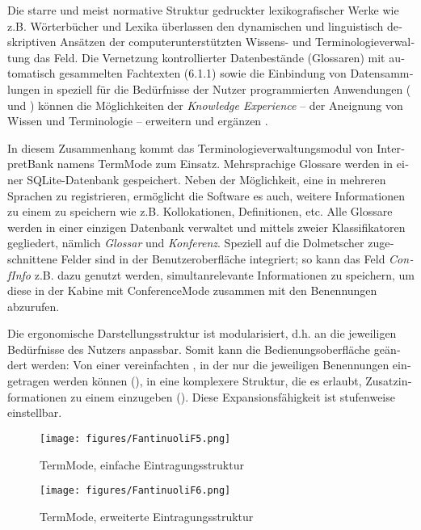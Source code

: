 \documentclass[output=paper]{LSP/langsci}
\begin{document}
\begin{otherlanguage}{ngerman}
Die starre und meist normative Struktur gedruckter lexikografischer Werke wie z.B. Wörterbücher und Lexika überlassen den dynamischen und linguistisch deskriptiven Ansätzen der computerunterstützten Wissens- und Terminologieverwaltung das Feld. Die Vernetzung kontrollierter Datenbestände (Glossaren) mit automatisch gesammelten Fachtexten (6.1.1) sowie die Einbindung von Datensammlungen in speziell für die Bedürfnisse der Nutzer programmierten Anwendungen ( und ) können die Möglichkeiten der \textit{Knowledge Experience} -- der Aneignung von Wissen und Terminologie -- erweitern und ergänzen \citep{Fantinuoli2009}. 

\largerpage
In diesem Zusammenhang kommt das Terminologieverwaltungsmodul von InterpretBank namens TermMode zum Einsatz. Mehrsprachige Glossare werden in einer SQLite-Datenbank gespeichert. Neben der Möglichkeit, eine  in mehreren Sprachen zu registrieren, ermöglicht die Software es auch, weitere Informationen zu einem  zu speichern wie z.B. Kollokationen, Definitionen, etc. Alle Glossare werden in einer einzigen Datenbank verwaltet und mittels zweier Klassifikatoren gegliedert, nämlich \textit{Glossar} und \textit{Konferenz}. Speziell auf die Dolmetscher zugeschnittene Felder sind in der Benutzeroberfläche integriert; so kann das Feld \textit{ConfInfo} z.B. dazu genutzt werden, simultanrelevante Informationen zu speichern, um diese in der Kabine mit ConferenceMode zusammen mit den Benennungen abzurufen.

Die ergonomische Darstellungsstruktur ist modularisiert, d.h. an die jeweiligen Bedürfnisse des Nutzers anpassbar. Somit kann die Bedienungsoberfläche geändert werden: Von einer vereinfachten , in der nur die jeweiligen Benennungen eingetragen werden können (), in eine komplexere Struktur, die es erlaubt, Zusatzinformationen zu einem  einzugeben (). Diese Expansionsfähigkeit ist stufenweise einstellbar. 

\begin{figure}
\texttt{[image: figures/FantinuoliF5.png]}
\caption{TermMode, einfache Eintragungsstruktur}
\label{fig:fantinuoli:5}
\end{figure} 

\begin{figure}
\texttt{[image: figures/FantinuoliF6.png]}
\caption{TermMode, erweiterte Eintragungsstruktur}
\label{fig:fantinuoli:6}
\end{figure} 


\end{otherlanguage}
\end{document}
